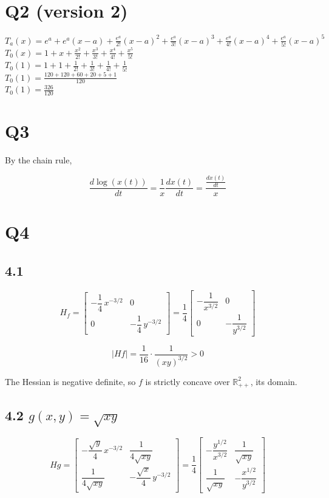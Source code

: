 \documentclass{article}
\begin{document}
\section*{Q2 (version 2)}

$T_a(x) = e^a+e^a(x-a)+\frac{e^a}{2!}(x-a)^2+\frac{e^a}{3!}(x-a)^3+\frac{e^a}{4!}(x-a)^4+\frac{e^a}{5!}(x-a)^5$\\
$T_0(x)=1+x+\frac{x^2}{2!}+\frac{x^3}{3!}+\frac{x^4}{4!}+\frac{x^5}{5!}$\\
$T_0(1)=1+1+\frac{1}{2!}+\frac{1}{3!}+\frac{1}{4!}+\frac{1}{5!}$\\
$T_0(1)=\frac{120+120+60+20+5+1}{120}$\\
$T_0(1)=\frac{326}{120}$

\section*{Q3}

By the chain rule,

$$\frac{d\log (x(t))}{dt} = \frac{1}{x}\frac{dx(t)}{dt} = \frac{\frac{dx(t)}{dt}}{x}$$

\section*{Q4}

\subsection*{4.1}

\[
H_f=
\begin{bmatrix}
-\dfrac{1}{4}\,x^{-3/2} & 0\\[10pt]
0 & -\dfrac{1}{4}\,y^{-3/2}
\end{bmatrix}
=\frac{1}{4}
\begin{bmatrix}
-\dfrac{1}{x^{3/2}} & 0\\[10pt]
0 & -\dfrac{1}{y^{3/2}}
\end{bmatrix}
\]

\[
|Hf|=\frac{1}{16}\cdot\frac{1}{(xy)^{3/2}}>0
\]

The Hessian is negative definite, so $f$ is strictly concave over
$\mathbb{R}^2_{++}$, its domain.

\subsection*{4.2 \quad $g(x,y)=\sqrt{xy}$}

\[
Hg=
\begin{bmatrix}
-\dfrac{\sqrt{y}}{4}\,x^{-3/2} & \dfrac{1}{4\sqrt{xy}}\\[10pt]
\dfrac{1}{4\sqrt{xy}} & -\dfrac{\sqrt{x}}{4}\,y^{-3/2}
\end{bmatrix}
=\frac{1}{4}
\begin{bmatrix}
-\dfrac{y^{1/2}}{x^{3/2}} & \dfrac{1}{\sqrt{xy}}\\[10pt]
\dfrac{1}{\sqrt{xy}} & -\dfrac{x^{1/2}}{y^{3/2}}
\end{bmatrix}
\]
\end{document}
